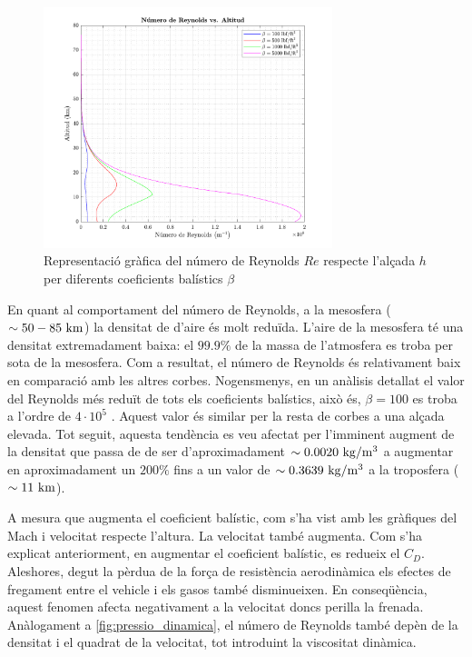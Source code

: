 \begin{figure}[ht]
    \centering
    \includegraphics[width=0.75\textwidth]{imagenes/01_ballistic_graficas/reynolds.pdf}
    \caption{Representació gràfica del número de Reynolds $Re$ respecte l'alçada $h$ per diferents coeficients balístics $\beta$}
    \label{fig:reynolds}
\end{figure}

En quant al comportament del número de Reynolds, a la mesosfera ($\sim 50 - 85\ \kilo \meter$) la densitat de d'aire és molt reduïda. L’aire de la mesosfera té una densitat extremadament baixa: el $99.9\%$ de la massa de l’atmosfera es troba per sota de la mesosfera. Com a resultat, el número de Reynolds és relativament baix en comparació amb les altres corbes. Nogensmenys, en un anàlisis detallat el valor del Reynolds més reduït de tots els coeficients balístics, això és, $\beta=100$ es troba a l'ordre de $4\cdot10^5$ . Aquest valor és similar per la resta de corbes a una alçada elevada. Tot seguit, aquesta tendència es veu afectat per l'imminent augment de la densitat que passa de de ser d'aproximadament $\sim 0.0020 \ \kilo\gram / \meter^3$ a augmentar en aproximadament un $200 \%$ fins a un valor de $\sim 0.3639 \ \kilo\gram / \meter^3$ a la troposfera ($\sim 11 \ \kilo\meter$).

A mesura que augmenta el coeficient balístic, com s'ha vist amb les gràfiques del Mach i velocitat respecte l'altura. La velocitat també augmenta. Com s'ha explicat anteriorment, en augmentar el coeficient balístic, es redueix el $C_D$. Aleshores, degut la pèrdua de la força de resistència aerodinàmica els efectes de fregament entre el vehicle i els gasos també disminueixen. En conseqüència, aquest fenomen afecta negativament a la velocitat doncs perilla la frenada. Anàlogament a \ref{fig:pressio_dinamica}, el número de Reynolds també depèn de la densitat i el quadrat de la velocitat, tot introduint la viscositat dinàmica.


